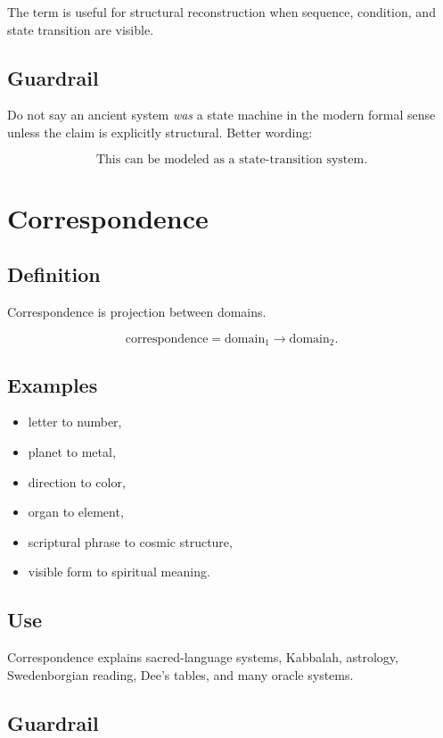 \documentclass[11pt]{book}
\begin{document}
The term is useful for structural reconstruction when sequence, condition, and state transition are visible.

\subsection*{Guardrail}

Do not say an ancient system \emph{was} a state machine in the modern formal sense unless the claim is explicitly structural. Better wording:

\[
\text{This can be modeled as a state-transition system.}
\]

\section{Correspondence}

\subsection*{Definition}

Correspondence is projection between domains.

\[
\text{correspondence} = \text{domain}_1 \rightarrow \text{domain}_2.
\]

\subsection*{Examples}

\begin{itemize}
    \item letter to number,
    \item planet to metal,
    \item direction to color,
    \item organ to element,
    \item scriptural phrase to cosmic structure,
    \item visible form to spiritual meaning.
\end{itemize}

\subsection*{Use}

Correspondence explains sacred-language systems, Kabbalah, astrology, Swedenborgian reading, Dee's tables, and many oracle systems.

\subsection*{Guardrail}
\end{document}
